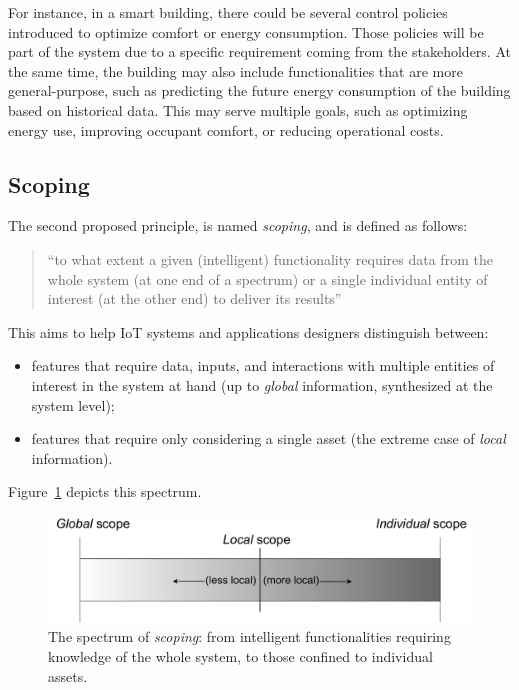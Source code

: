 For instance, in a smart building, there could be several control policies introduced to optimize comfort or energy consumption.
%
Those policies will be part of the system due to a specific requirement coming from the stakeholders.
%
At the same time, the building may also include functionalities that are more general-purpose, such as predicting the future energy consumption of the building based on historical data.
%
This may serve multiple goals, such as optimizing energy use, improving occupant comfort, or reducing operational costs.

\subsection{Scoping} 

The second proposed principle, is named \emph{scoping}, and is defined as follows:
\begin{quote}
    ``to what extent a given (intelligent) functionality requires data from the whole system (at one end of a spectrum) or a single individual entity of interest (at the other end) to deliver its results''
\end{quote}
This aims to help IoT systems and applications designers distinguish between:
\begin{itemize}
    \item features that require data, inputs, and interactions with multiple entities of interest in the system at hand (up to \emph{global} information, synthesized at the system level);
    \item features that require only considering a single asset (the extreme case of \emph{local} information).
\end{itemize}
Figure~\ref{fig:scope} depicts this spectrum. 

\begin{figure}
    \centering
    \includegraphics[width=.6\columnwidth]{figures/dt-mas/scope-spectrum.pdf}
    \caption{The spectrum of \emph{scoping}: from intelligent functionalities requiring knowledge of the whole system, to those confined to individual assets.}
    \label{fig:scope}
    
\end{figure}



